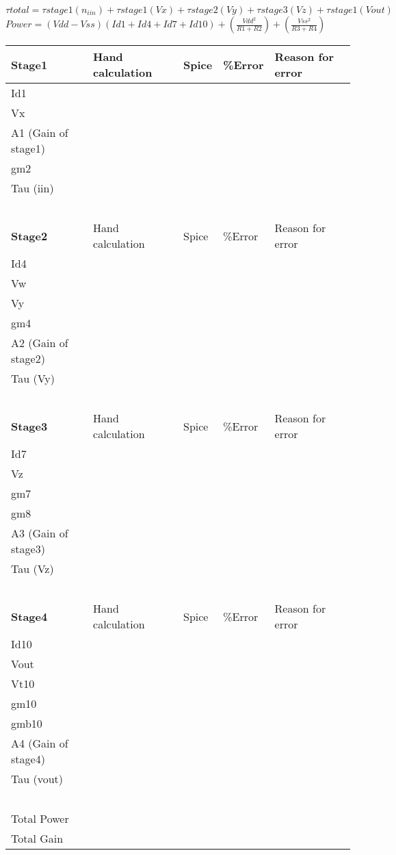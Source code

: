 \documentclass[12pt,a4paper]{article}
\begin{document}
$\tau total=\tau stage1(n_{iin})+\tau stage1(Vx)+\tau stage2(Vy)+\tau 
stage3(Vz)+\tau stage1 (Vout)$\\


$
Power=(Vdd-Vss)(Id1+Id4+Id7+Id10)+(\frac{Vdd^{2}}{R1+R2})+(\frac{Vss^{2}}{R3+R4}) 
$\\


\begin{table}[h]
\centering
\begin{tabular}{|l|l|l|l|l|}
\hline
\textbf{Stage1} & Hand calculation & Spice & \%Error & Reason for 
error \\
\hline
Id1 &   &   &   &   \\
\hline
Vx &   &   &   &   \\
\hline
A1 (Gain of stage1) &   &   &   &   \\
\hline
gm2 &   &   &   &   \\
\hline
Tau (iin) &   &   &   &   \\
\hline
  &   &   &   &   \\
\hline
\textbf{Stage2} & Hand calculation & Spice & \%Error & Reason for 
error \\
\hline
Id4 &   &   &   &   \\
\hline
Vw &   &   &   &   \\
\hline
Vy &   &   &   &   \\
\hline
gm4 &   &   &   &   \\
\hline
A2 (Gain of stage2) &   &   &   &   \\
\hline
Tau (Vy) &   &   &   &   \\
\hline
  &   &   &   &   \\
\hline
\textbf{Stage3} & Hand calculation & Spice & \%Error & Reason for 
error \\
\hline
Id7 &   &   &   &   \\
\hline
Vz &   &   &   &   \\
\hline
gm7 &   &   &   &   \\
\hline
gm8 &   &   &   &   \\
\hline
A3 (Gain of stage3) &   &   &   &   \\
\hline
Tau (Vz) &   &   &   &   \\
\hline
  &   &   &   &   \\
\hline
\textbf{Stage4} & Hand calculation & Spice & \%Error & Reason for 
error \\
\hline
Id10 &   &   &   &   \\
\hline
Vout &   &   &   &   \\
\hline
Vt10 &   &   &   &   \\
\hline
gm10 &   &   &   &   \\
\hline
gmb10 &   &   &   &   \\
\hline
A4 (Gain of stage4) &   &   &   &   \\
\hline
Tau (vout) &   &   &   &   \\
\hline
  &   &   &   &   \\
\hline
Total Power &   &   &   &   \\
\hline
Total Gain &   &   &   &   \\
\hline
\end{tabular}
\end{table}
\end{document}
